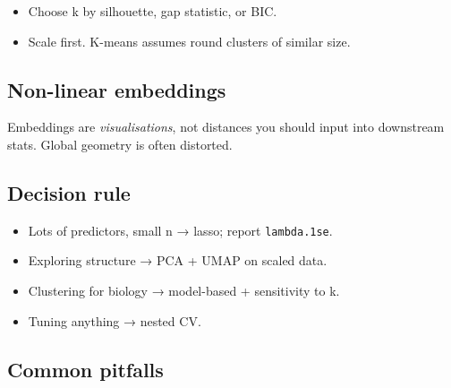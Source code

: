 \documentclass[
]{article}
\newenvironment{Shaded}{\begin{snugshade}}{\end{snugshade}}
\newcommand{\AttributeTok}[1]{\textcolor[rgb]{0.13,0.29,0.53}{#1}}
\newcommand{\DecValTok}[1]{\textcolor[rgb]{0.00,0.00,0.81}{#1}}
\newcommand{\FloatTok}[1]{\textcolor[rgb]{0.00,0.00,0.81}{#1}}
\newcommand{\FunctionTok}[1]{\textcolor[rgb]{0.13,0.29,0.53}{\textbf{#1}}}
\newcommand{\NormalTok}[1]{#1}
\newcommand{\OtherTok}[1]{\textcolor[rgb]{0.56,0.35,0.01}{#1}}
\newcommand{\SpecialCharTok}[1]{\textcolor[rgb]{0.81,0.36,0.00}{\textbf{#1}}}
\providecommand{\tightlist}{%
  \setlength{\itemsep}{0pt}\setlength{\parskip}{0pt}}
\begin{document}
\begin{itemize}
\tightlist
\item
  Choose k by silhouette, gap statistic, or BIC.
\item
  Scale first. K-means assumes round clusters of similar size.
\end{itemize}

\subsection{Non-linear embeddings}\label{non-linear-embeddings}

\begin{Shaded}
\end{Shaded}

Embeddings are \emph{visualisations}, not distances you should input
into downstream stats. Global geometry is often distorted.

\subsection{Decision rule}\label{decision-rule-12}

\begin{itemize}
\tightlist
\item
  Lots of predictors, small n → lasso; report \texttt{lambda.1se}.
\item
  Exploring structure → PCA + UMAP on scaled data.
\item
  Clustering for biology → model-based + sensitivity to k.
\item
  Tuning anything → nested CV.
\end{itemize}

\subsection{Common pitfalls}\label{common-pitfalls-12}
\end{document}
